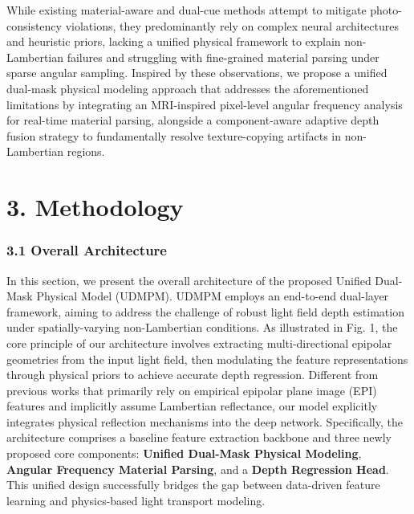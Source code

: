 \documentclass[journal]{IEEEtran}
\begin{document}
While existing material-aware and dual-cue methods attempt to mitigate photo-consistency violations, they predominantly rely on complex neural architectures and heuristic priors, lacking a unified physical framework to explain non-Lambertian failures and struggling with fine-grained material parsing under sparse angular sampling. Inspired by these observations, we propose a unified dual-mask physical modeling approach that addresses the aforementioned limitations by integrating an MRI-inspired pixel-level angular frequency analysis for real-time material parsing, alongside a component-aware adaptive depth fusion strategy to fundamentally resolve texture-copying artifacts in non-Lambertian regions.

\section{3. Methodology}

\subsubsection{3.1 Overall Architecture}

In this section, we present the overall architecture of the proposed Unified Dual-Mask Physical Model (UDMPM). UDMPM employs an end-to-end dual-layer framework, aiming to address the challenge of robust light field depth estimation under spatially-varying non-Lambertian conditions. As illustrated in Fig. 1, the core principle of our architecture involves extracting multi-directional epipolar geometries from the input light field, then modulating the feature representations through physical priors to achieve accurate depth regression. Different from previous works that primarily rely on empirical epipolar plane image (EPI) features and implicitly assume Lambertian reflectance, our model explicitly integrates physical reflection mechanisms into the deep network. Specifically, the architecture comprises a baseline feature extraction backbone and three newly proposed core components: \textbf{Unified Dual-Mask Physical Modeling}, \textbf{Angular Frequency Material Parsing}, and a \textbf{Depth Regression Head}. This unified design successfully bridges the gap between data-driven feature learning and physics-based light transport modeling.
\end{document}
